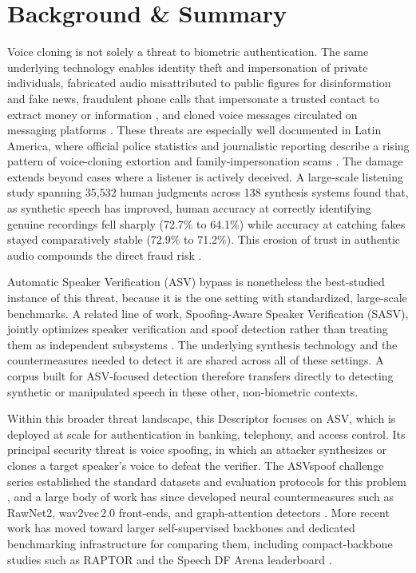 \documentclass[11pt]{article}
\begin{document}
\section*{Background \& Summary}

Voice cloning is not solely a threat to biometric authentication. The same underlying technology enables identity theft and impersonation of private individuals, fabricated audio misattributed to public figures for disinformation and fake news, fraudulent phone calls that impersonate a trusted contact to extract money or information \citep{forbes2019ceofraud,destefano2023testimony,europol2022deepfakes}, and cloned voice messages circulated on messaging platforms \citep{infobae2026whatsapp}. These threats are especially well documented in Latin America, where official police statistics and journalistic reporting describe a rising pattern of voice-cloning extortion and family-impersonation scams \citep{infobae2025colombia,infobae2026whatsapp}. The damage extends beyond cases where a listener is actively deceived. A large-scale listening study spanning 35{,}532 human judgments across 138 synthesis systems found that, as synthetic speech has improved, human accuracy at correctly identifying genuine recordings fell sharply (72.7\% to 64.1\%) while accuracy at catching fakes stayed comparatively stable (72.9\% to 71.2\%). This erosion of trust in authentic audio compounds the direct fraud risk \citep{muller2026erodingtrust}.

Automatic Speaker Verification (ASV) bypass is nonetheless the best-studied instance of this threat, because it is the one setting with standardized, large-scale benchmarks. A related line of work, Spoofing-Aware Speaker Verification (SASV), jointly optimizes speaker verification and spoof detection rather than treating them as independent subsystems \citep{sasvevalplan2022,sasv2022}. The underlying synthesis technology and the countermeasures needed to detect it are shared across all of these settings. A corpus built for ASV-focused detection therefore transfers directly to detecting synthetic or manipulated speech in these other, non-biometric contexts.

Within this broader threat landscape, this Descriptor focuses on ASV, which is deployed at scale for authentication in banking, telephony, and access control. Its principal security threat is voice spoofing, in which an attacker synthesizes or clones a target speaker's voice to defeat the verifier. The ASVspoof challenge series established the standard datasets and evaluation protocols for this problem \citep{asvspoof2019,asvspoof2021,asvspoof5}, and a large body of work has since developed neural countermeasures such as RawNet2, wav2vec\,2.0 front-ends, and graph-attention detectors \citep{rawnet2,tak2022ssl,aasist}. More recent work has moved toward larger self-supervised backbones and dedicated benchmarking infrastructure for comparing them, including compact-backbone studies such as RAPTOR \citep{raptor2026} and the Speech DF Arena leaderboard \citep{dowerah2025speechdfarena}.
\end{document}

